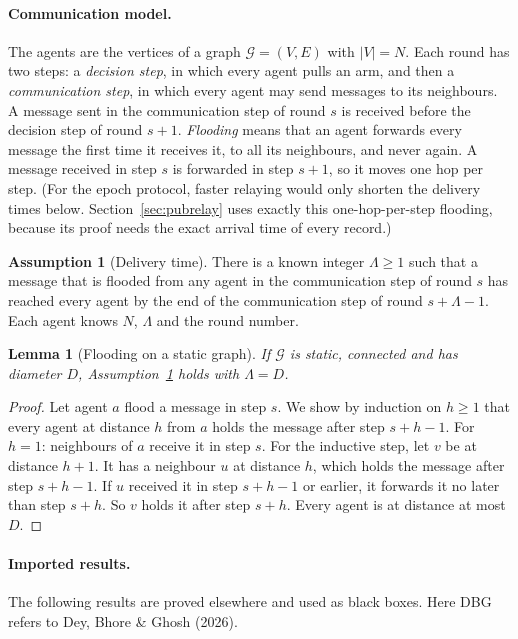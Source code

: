\documentclass[11pt]{article}
\newtheorem{lemma}[theorem]{Lemma}
\theoremstyle{definition}
\newtheorem{assumption}{Assumption}
\newcommand{\cG}{\mathcal{G}}
\begin{document}
\paragraph{Communication model.} The agents are the vertices of a graph $\cG=(V,E)$ with $|V|=N$. Each round has
two steps: a \emph{decision step}, in which every agent pulls an arm, and then a \emph{communication step}, in which
every agent may send messages to its neighbours. A message sent in the communication step of round $s$ is
received before the decision step of round $s+1$. \emph{Flooding} means that an agent forwards every message the
first time it receives it, to all its neighbours, and never again. A message received in step $s$ is forwarded in
step $s+1$, so it moves one hop per step. (For the epoch protocol, faster relaying would only shorten the delivery
times below. Section~\ref{sec:pubrelay} uses exactly this one-hop-per-step flooding, because its proof needs the exact
arrival time of every record.)

\begin{assumption}[Delivery time]\label{ass:delivery}
There is a known integer $\Lambda\ge1$ such that a message that is flooded from any agent in the communication step
of round $s$ has reached every agent by the end of the communication step of round $s+\Lambda-1$. Each agent knows
$N$, $\Lambda$ and the round number.
\end{assumption}

\begin{lemma}[Flooding on a static graph]\label{lem:flood}
If $\cG$ is static, connected and has diameter $D$, Assumption~\ref{ass:delivery} holds with $\Lambda=D$.
\end{lemma}
\begin{proof}
Let agent $a$ flood a message in step $s$. We show by induction on $h\ge1$ that every agent at distance $h$ from
$a$ holds the message after step $s+h-1$. For $h=1$: neighbours of $a$ receive it in step $s$. For the inductive step,
let $v$ be at distance $h+1$. It has a neighbour $u$ at distance $h$, which holds the message after step $s+h-1$. If
$u$ received it in step $s+h-1$ or earlier, it forwards it no later than step $s+h$. So $v$ holds it after step $s+h$.
Every agent is at distance at most $D$.
\end{proof}

\paragraph{Imported results.} The following results are proved elsewhere and used as black boxes.
Here DBG refers to Dey, Bhore \& Ghosh (2026).
\end{document}
